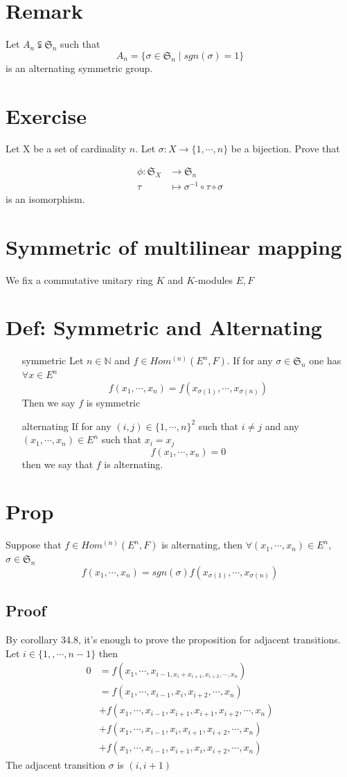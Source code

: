 \documentclass{book}
\begin{document}
\section{Remark}
Let $A_n\subsetneqq\mathfrak{S}_n$ such that 
$$A_n=\{\sigma\in \mathfrak{S}_n\mid sgn(\sigma)=1\}$$
is an alternating symmetric group.
\section{Exercise}
Let X be a set of cardinality $n$. Let $\sigma:X\rightarrow\{1,\cdots,n\}$ be a bijection. Prove that 

$$
\begin{aligned}
    \phi:\mathfrak{S}_X &\rightarrow \mathfrak{S}_n\\
    \tau &\mapsto \sigma^{-1}\circ\tau\circ\sigma
\end{aligned}
$$ is an isomorphism.
\section{Symmetric of multilinear mapping}
We fix a commutative unitary ring $K$ and $K$-modules $E,F$
\section{Def: Symmetric and Alternating}
\begin{itemize}
    \item [symmetric]Let $n\in \mathbb{N}$ and $f\in Hom^{(n)}(E^n,F)$. If for any $\sigma\in \mathfrak{S}_n$ one has $\forall x\in E^n$$$f(x_1,\cdots,x_n)=f(x_{\sigma(1)},\cdots,x_{\sigma(n)})$$
    Then we say $f$ is symmetric
    \item [alternating]If for any $(i,j)\in \{1,\cdots,n\}^2$ such that $i\neq j$ and any $(x_1,\cdots,x_n)\in E^n$ such that $x_i=x_j$$$f(x_1,\cdots,x_n)=0$$ then we say that $f$ is alternating.
\end{itemize}
\section{Prop}
Suppose that $f\in Hom^{(n)}(E^n,F)$ is alternating, then $\forall(x_1,\cdots,x_n)\in E^n$,\\$\sigma\in \mathfrak{S}_n$
$$f(x_1,\cdots,x_n)=sgn(\sigma)f(x_{\sigma(1)},\cdots,x_{\sigma(n)})$$
\subsection*{Proof}
By corollary 34.8, it's enough to prove the proposition for adjacent transitions. Let $i\in \{1,,\cdots,n-1\}$ then $$
\begin{aligned}
    0 &=f(x_1,\cdots,x_{i-1,x_i+x_{i+1},x_{i+2},\cdots,x_n})\\
    &=f(x_1,\cdots,x_{i-1},x_i,x_{i+2},\cdots,x_n)\\ &+f(x_1,\cdots,x_{i-1},x_{i+1},x_{i+1},x_{i+2},\cdots,x_n)\\
    &+f(x_1,\cdots,x_{i-1},x_i,x_{i+1},x_{i+2},\cdots,x_n)\\
    &+f(x_1,\cdots,x_{i-1},x_{i+1},x_i,x_{i+2},\cdots,x_n)
\end{aligned}$$
The adjacent transition $\sigma$ is $(i,i+1)$
\end{document}
